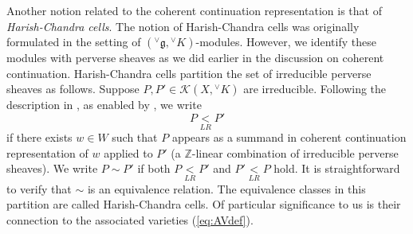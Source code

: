 \documentclass[a4paper, 11pt]{article}
\begin{document}
Another notion related to the coherent continuation representation is
that of \emph{Harish-Chandra cells}.  The notion of Harish-Chandra
cells was originally formulated in the setting of
$({^\vee}\mathfrak{g}, {^\vee}K)$-modules.  However, we identify these
modules with perverse sheaves as we did earlier in the discussion on
coherent continuation.
Harish-Chandra cells  partition the
set of irreducible perverse sheaves as follows. Suppose $P, P' \in
\mathscr{K}(X, 
{^\vee}K)$ are irreducible.  Following the description
in \cite[{Definition~2.5}]{Barbasch-Vogan-Trombi}, as enabled by  
\cite[{Proposition~2.6}]{Barbasch-Vogan-Trombi}, we write
$$P\underset{LR}{<}P'$$
if there exists $w \in W$ such that $P$ appears as a summand
in coherent continuation representation of $w$ applied to $P'$ (a
$\mathbb{Z}$-linear combination of irreducible perverse sheaves).
We write $P\sim P'$ if both $P\underset{LR}{<}P'$ and
$P'\underset{LR}{<}P$ hold. It is  
straightforward to verify that $\sim$ is an equivalence
relation. 
The equivalence classes in this partition are called Harish-Chandra cells.
Of particular significance to us is their connection to the associated
varieties (\ref{eq:AVdef}).
\end{document}
